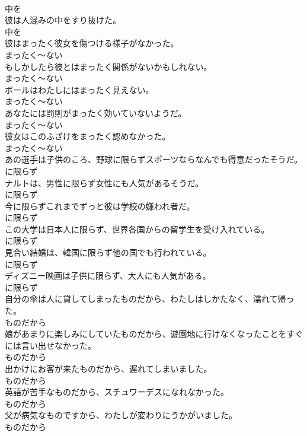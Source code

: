 \documentclass[8pt]{extreport}
\begin{document}
\begin{CJK}{UTF8}{min}
\\	中を	
\\	彼は人混みの中をすり抜けた。	
\\	中を	
\\	彼はまったく彼女を傷つける様子がなかった。	
\\	まったく～ない	
\\	もしかしたら彼とはまったく関係がないかもしれない。	
\\	まったく～ない	
\\	ボールはわたしにはまったく見えない。	
\\	まったく～ない	
\\	あなたには罰則がまったく効いていないようだ。	
\\	まったく～ない	
\\	彼女はこのふざけをまったく認めなかった。	
\\	まったく～ない	
\\	あの選手は子供のころ、野球に限らずスポーツならなんでも得意だったそうだ。	
\\	に限らず	
\\	ナルトは、男性に限らず女性にも人気があるそうだ。	
\\	に限らず	
\\	今に限らずこれまでずっと彼は学校の嫌われ者だ。	
\\	に限らず	
\\	この大学は日本人に限らず、世界各国からの留学生を受け入れている。	
\\	に限らず	
\\	見合い結婚は、韓国に限らず他の国でも行われている。	
\\	に限らず	
\\	ディズニー映画は子供に限らず、大人にも人気がある。	
\\	に限らず	
\\	自分の傘は人に貸してしまったものだから、わたしはしかたなく、濡れて帰った。	
\\	ものだから	
\\	娘があまりに楽しみにしていたものだから、遊園地に行けなくなったことをすぐには言い出せなかった。	
\\	ものだから	
\\	出かけにお客が来たものだから、遅れてしまいました。	
\\	ものだから	
\\	英語が苦手なものだから、スチュワーデスになれなかった。	
\\	ものだから	
\\	父が病気なものですから、わたしが変わりにうかがいました。	
\\	ものだから	

\end{CJK}
\end{document}
